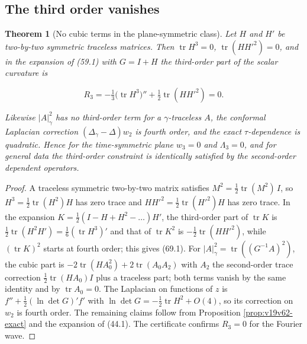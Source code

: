 \documentclass[11pt]{article}
\newtheorem{theorem}{Theorem}[section]
\theoremstyle{remark}
\begin{document}
\subsection{The third order vanishes}

\begin{theorem}[No cubic terms in the plane-symmetric class]
\label{thm:v19v66-cubic}
Let \(H\) and \(H'\) be two-by-two symmetric traceless matrices.  Then
\(\operatorname{tr}H^3=0\), \(\operatorname{tr}(HH'^2)=0\), and in the
expansion of (59.1) with \(G=I+H\) the third-order part of the scalar
curvature is

\[
 R_3=-\tfrac13\bigl(\operatorname{tr}H^3\bigr)''+\tfrac12\operatorname{tr}(HH'^2)=0.
                                                                    \tag{69.1}
\]

Likewise \(|A|_\gamma^2\) has no third-order term for a
\(\gamma\)-traceless \(A\), the conformal Laplacian correction
\((\Delta_\gamma-\Delta)w_2\) is fourth order, and the exact
\(\tau\)-dependence is quadratic.  Hence for the time-symmetric plane
\(w_3=0\) and \(\Lambda_3=0\), and for general data the third-order
constraint is identically satisfied by the second-order dependent
operators.
\end{theorem}

\begin{proof}
A traceless symmetric two-by-two matrix satisfies
\(M^2=\tfrac12\operatorname{tr}(M^2)\,I\), so
\(H^3=\tfrac12\operatorname{tr}(H^2)H\) has zero trace and
\(HH'^2=\tfrac12\operatorname{tr}(H'^2)H\) has zero trace.  In the
expansion \(K=\tfrac12(I-H+H^2-\dots)H'\), the third-order part of
\(\operatorname{tr}K\) is \(\tfrac12\operatorname{tr}(H^2H')=\tfrac16(\operatorname{tr}H^3)'\)
and that of \(\operatorname{tr}K^2\) is \(-\tfrac12\operatorname{tr}(HH'^2)\),
while \((\operatorname{tr}K)^2\) starts at fourth order; this gives
(69.1).  For \(|A|^2_\gamma=\operatorname{tr}((G^{-1}A)^2)\), the cubic
part is \(-2\operatorname{tr}(HA_0^2)+2\operatorname{tr}(A_0A_2)\) with
\(A_2\) the second-order trace correction \(\tfrac12\operatorname{tr}(HA_0)I\)
plus a traceless part; both terms vanish by the same identity and by
\(\operatorname{tr}A_0=0\).  The Laplacian on functions of \(z\) is
\(f''+\tfrac12(\ln\det G)'f'\) with \(\ln\det G=-\tfrac12\operatorname{tr}H^2+O(4)\),
so its correction on \(w_2\) is fourth order.  The remaining claims
follow from Proposition \ref{prop:v19v62-exact} and the expansion of
(44.1).  The certificate confirms \(R_3=0\) for the Fourier wave.
\end{proof}
\end{document}
